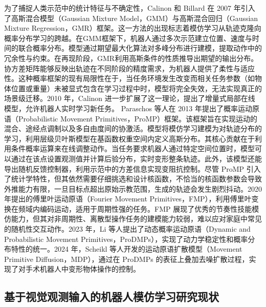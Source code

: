 为了捕捉人类示范中的统计特征与不确定性，Calinon 和 Billard 在 2007 年引入了高斯混合模型（Gaussian Mixture Model，GMM）与高斯混合回归（Gaussian Mixture Regression，GMR）框架\cite{calinon2007learning}。这一方法的出现标志着模仿学习从轨迹克隆向概率分布学习的跨越。在GMM框架下，机器人通过多次示范建立位置、速度与时间的联合概率分布。模型通过期望最大化算法对多峰分布进行建模，提取动作中的冗余性与约束。在再现阶段，GMR利用高斯条件的性质推导出期望的输出分布。协方差矩阵能够反映出轨迹在不同阶段的精度需求，为机器人提供了柔性与适应性。这种概率框架的现有局限性在于，当任务环境发生改变而相关任务参数（如物体位置或重量）未被显式包含在学习过程中时，模型将完全失效，无法实现真正的场景级迁移。2010 年，Calinon 进一步扩展了这一理论，提出了增量式局部在线模型，允许机器人实时学习新任务\cite{calinon2010learning}。
Paraschos 等人在 2013 年提出了概率运动原语（Probabilistic Movement Primitives，ProMP）框架\cite{paraschos2013probabilistic}。该框架旨在实现运动的混合、途经点调制以及多自由度间的协激活。模型将模仿学习建模为对轨迹分布的学习，利用层级贝叶斯模型在基函数权重空间内定义高斯分布。其核心贡献在于利用条件概率运算来在线调整动作。当任务要求机器人通过特定空间位置时，模型可以通过在该点设置观测值并计算后验分布，实时变形整条轨迹。此外，该模型还能导出随机反馈控制器，利用示范中的方差信息实现变阻抗控制。尽管 ProMP 引入了统计学特性，但其依然需要仔细挑选和设计核函数，不恰当的核函数参数会导致外推能力有限，一旦目标点超出原始示教范围，生成的轨迹会发生剧烈抖动。2020 年提出的傅里叶运动原语（Fourier Movement Primitives，FMP），利用傅里叶变换在频域内编码运动，适用于周期性强的任务\cite{kulak2020fourier}。FMP 展现了优秀的节奏性技能模仿能力，但其对非周期性、离散型操作任务的建模能力较弱，难以应对家庭中常见的随机性交互动作。2023 年，Li 等人提出了动态概率运动原语（Dynamic and Probabilistic Movement Primitives，ProDMPs），实现了动力学稳定性和概率分布特性的统一\cite{li2023prodmp}。2024 年，Scheikl 等人开发的运动原语扩散模型（Movement Primitive Diffusion，MDP），通过在 ProDMPs 的表征上叠加去噪扩散过程，实现了对手术机器人中变形物体操作的控制\cite{scheikl2024movement}。

\subsection{基于视觉观测输入的机器人模仿学习研究现状}

